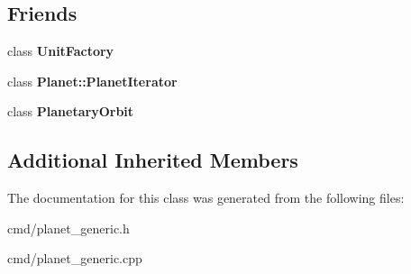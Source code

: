 \subsection*{Friends}
\begin{DoxyCompactItemize}
\item 
class {\bfseries Unit\+Factory}\hypertarget{classPlanet_a187c66d2d867f6265d3b0c99ffc34838}{}\label{classPlanet_a187c66d2d867f6265d3b0c99ffc34838}

\item 
class {\bfseries Planet\+::\+Planet\+Iterator}\hypertarget{classPlanet_a19c8a3f114292356a9bea4371bceb4c0}{}\label{classPlanet_a19c8a3f114292356a9bea4371bceb4c0}

\item 
class {\bfseries Planetary\+Orbit}\hypertarget{classPlanet_aa0e5d74fa4ec6dca72b358c4c600203f}{}\label{classPlanet_aa0e5d74fa4ec6dca72b358c4c600203f}

\end{DoxyCompactItemize}
\subsection*{Additional Inherited Members}


The documentation for this class was generated from the following files\+:\begin{DoxyCompactItemize}
\item 
cmd/planet\+\_\+generic.\+h\item 
cmd/planet\+\_\+generic.\+cpp\end{DoxyCompactItemize}
